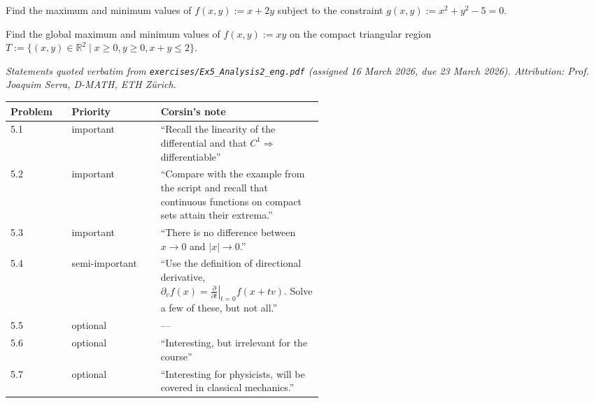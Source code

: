 \begin{aiexercise}
\label{ex:ai_lagrange_circle}
Find the maximum and minimum values of $f(x,y) := x + 2y$ subject to the constraint $g(x,y) := x^2 + y^2 - 5 = 0$.
\end{aiexercise}

\begin{aiexercise}
\label{ex:ai_extrema_triangle}
Find the global maximum and minimum values of $f(x,y) := xy$ on the compact triangular region $T := \{(x,y) \in \mathbb{R}^2 \mid x \ge 0, y \ge 0, x+y \le 2\}$.
\end{aiexercise}


\textit{Statements quoted verbatim from \texttt{exercises/Ex5\_Analysis2\_eng.pdf} (assigned 16
March 2026, due 23 March 2026). Attribution: Prof. Joaquim Serra, D-MATH, ETH Z\"urich.}

\begin{ainote}
\begin{center}
\begin{tabular}{@{}l l p{0.52\linewidth}@{}}
\textbf{Problem} & \textbf{Priority} & \textbf{Corsin's note} \\
\hline
5.1 & important & ``Recall the linearity of the differential and that $C^1 \Rightarrow$
  differentiable'' \\[3pt]
5.2 & important & ``Compare with the example from the script and recall that continuous
  functions on compact sets attain their extrema.'' \\[3pt]
5.3 & important & ``There is no difference between $x \to 0$ and $|x| \to 0$.'' \\[3pt]
5.4 & semi-important & ``Use the definition of directional derivative,
  $\partial_v f(x) = \left.\frac{\partial}{\partial t}\right|_{t=0} f(x+tv)$. Solve a few of
  these, but not all.'' \\[3pt]
5.5 & optional & --- \\[3pt]
5.6 & optional & ``Interesting, but irrelevant for the course'' \\[3pt]
5.7 & optional & ``Interesting for physicists, will be covered in classical mechanics.'' \\
\end{tabular}
\end{center}
\end{ainote}


